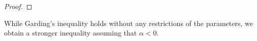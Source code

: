 \documentclass[preprint]{elsarticle}
\numberwithin{equation}{section}
\newcommand {\R}	{\mathbb{R}}
\renewcommand{\Re}{\mathrm{Re}}
\renewcommand{\H}{\mathrm{H}}
\newcommand{\dk}[1]{\partial_{#1}}
\newcommand{\dz}{\dk{z}}
\newcommand{\nablaH}{\nabla_{\H}}
\newcommand{\rL}{\mathrm{L}}
\newcommand{\rH}{\H}
\newcommand{\rE}{\mathrm{E}}
\begin{document}
\begin{proof}
\end{proof}

While Garding's inequality holds without any restrictions of the parameters, we obtain a stronger inequality assuming that $\alpha < 0$.
\end{document}
